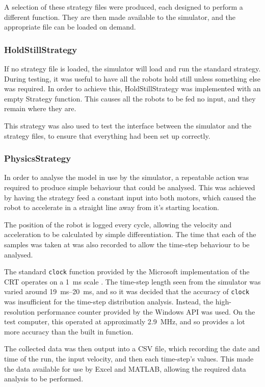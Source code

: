 \documentclass[10pt]{article}
\begin{document}
A selection of these strategy files were produced, each designed to perform a
different function.  They are then made available to the simulator, and the
appropriate file can be loaded on demand.

\subsubsection{HoldStillStrategy}

If no strategy file is loaded, the simulator will load and run the standard
strategy.  During testing, it was useful to have all the robots hold still
unless something else was required.  In order to achieve this, HoldStillStrategy
was implemented with an empty Strategy function.  This causes all the robots to
be fed no input, and they remain where they are.

This strategy was also used to test the interface between the simulator and the
strategy files, to ensure that everything had been set up correctly.

\subsubsection{PhysicsStrategy}

In order to analyse the model in use by the simulator, a repeatable
action was required to produce simple behaviour that could be analysed.  This
was achieved by having the strategy feed a constant input into both motors,
which caused the robot to accelerate in a straight line away from it's starting
location.

The position of the robot is logged every cycle, allowing the velocity and
acceleration to be calculated by simple differentiation.  The time that each of
the samples was taken at was also recorded to allow the time-step behaviour to be
analysed.

The standard \texttt{clock} function provided by the Microsoft implementation of
the \ac{CRT} operates on a \SI{1}{\milli\second} scale \cite{windowsSDK}.  The
time-step length seen from the simulator was varied around
\SIrange{19}{20}{\milli\second}, and so it was decided that the accuracy of
\texttt{clock} was insufficient for the time-step distribution analysis.
Instead, the high-resolution performance counter provided by the Windows API was
used.  On the test computer, this operated at approximatly
\SI{2.9}{\mega\hertz}, and so provides a lot more accuracy than the built in
function.  

The collected data was then output into a \ac{CSV} file, which recording the
date and time of the run, the input velocity, and then each time-step's values. 
This made the data available for use by Excel and MATLAB, allowing the required
data analysis to be performed.
\end{document}
